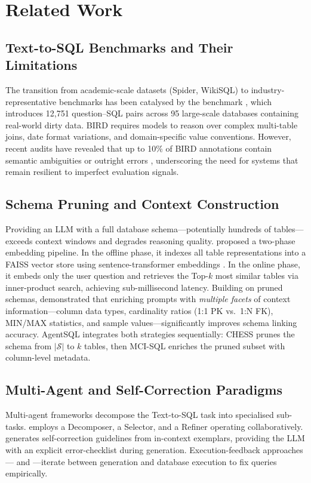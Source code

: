 \section{Related Work}
\label{sec:related_work}

\subsection{Text-to-SQL Benchmarks and Their Limitations}
The transition from academic-scale datasets (Spider, WikiSQL) to industry-representative benchmarks has been catalysed by the  benchmark \cite{li_can_2023}, which introduces 12,751 question--SQL pairs across 95 large-scale databases containing real-world dirty data. BIRD requires models to reason over complex multi-table joins, date format variations, and domain-specific value conventions. However, recent audits have revealed that up to 10\% of BIRD annotations contain semantic ambiguities or outright errors \cite{floratou2024broken}, underscoring the need for systems that remain resilient to imperfect evaluation signals.

\subsection{Schema Pruning and Context Construction}
Providing an LLM with a full database schema---potentially hundreds of tables---exceeds context windows and degrades reasoning quality.  \cite{talaei_chess_2024} proposed a two-phase embedding pipeline. In the offline phase, it indexes all table representations into a FAISS vector store \cite{johnson2019faiss} using sentence-transformer embeddings \cite{xiao2024cpackpackedresourcesgeneral}. In the online phase, it embeds only the user question and retrieves the Top-$k$ most similar tables via inner-product search, achieving sub-millisecond latency.
Building on pruned schemas,  \cite{wang_mci-sql_2026} demonstrated that enriching prompts with \emph{multiple facets} of context information---column data types, cardinality ratios (1:1 PK vs.\ 1:N FK), MIN/MAX statistics, and sample values---significantly improves schema linking accuracy. AgentSQL integrates both strategies sequentially: CHESS prunes the schema from $|\mathcal{S}|$ to $k$ tables, then MCI-SQL enriches the pruned subset with column-level metadata.

\subsection{Multi-Agent and Self-Correction Paradigms}
Multi-agent frameworks decompose the Text-to-SQL task into specialised sub-tasks.  \cite{wang_mac-sql_2025} employs a Decomposer, a Selector, and a Refiner operating collaboratively.  \cite{askari_magic_2024} generates self-correction guidelines from in-context exemplars, providing the LLM with an explicit error-checklist during generation. Execution-feedback approaches--- \cite{zhu2026revisqlachievinghumanleveltexttosql} and  \cite{heidari_agentiql_2025}---iterate between generation and database execution to fix queries empirically.

